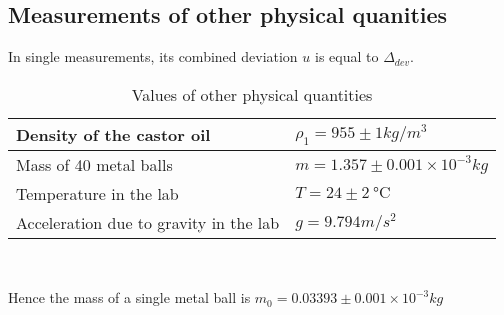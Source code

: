 \subsection{Measurements of other physical quanities}
    In single measurements, its combined deviation $u$ is equal to $\Delta_{dev}$.
    \begin{table}[htbp]
        \centering
        \begin{tabular}{ll}
            \hline\hline
            Density of the castor oil & $\rho_1=955\pm 1kg/m^3$\\
            \hline
            Mass of 40 metal balls & $m=1.357\pm 0.001\times10^{-3}kg$\\
            \hline      
            Temperature in the lab & $T=24\pm \SI{2}{\degreeCelsius}$\\
            \hline
            Acceleration due to gravity in the lab & $g=9.794m/s^2$\\        
            \hline\hline
        \end{tabular}\\
        \caption{Values of other physical quantities}
        \label{other}
    \end{table}
    Hence the mass of a single metal ball is $m_0=0.03393\pm 0.001\times10^{-3}kg$